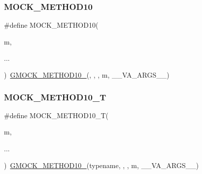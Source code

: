 \mbox{\label{_obj__test_2lib_2googletest-master_2googlemock_2include_2gmock_2gmock-generated-function-mockers_8h_a01760fdd295f5a92264eed6a9ff1dbf8}} 
\subsubsection{\texorpdfstring{MOCK\_METHOD10}{MOCK\_METHOD10}}
{\footnotesize\ttfamily \#define M\+O\+C\+K\+\_\+\+M\+E\+T\+H\+O\+D10(\begin{DoxyParamCaption}\item[{}]{m,  }\item[{}]{... }\end{DoxyParamCaption})~\mbox{\hyperlink{_obj__test_2lib_2googletest-release-1_88_81_2googlemock_2include_2gmock_2gmock-generated-function-mockers_8h_a81a48223a8771de36ef92ac6d56f6e81}{G\+M\+O\+C\+K\+\_\+\+M\+E\+T\+H\+O\+D10\+\_\+}}(, , , m, \+\_\+\+\_\+\+V\+A\+\_\+\+A\+R\+G\+S\+\_\+\+\_\+)}

\mbox{\label{_obj__test_2lib_2googletest-master_2googlemock_2include_2gmock_2gmock-generated-function-mockers_8h_aa28723ba52933b5ea9a4ffa1a73d15e1}} 
\subsubsection{\texorpdfstring{MOCK\_METHOD10\_T}{MOCK\_METHOD10\_T}}
{\footnotesize\ttfamily \#define M\+O\+C\+K\+\_\+\+M\+E\+T\+H\+O\+D10\+\_\+T(\begin{DoxyParamCaption}\item[{}]{m,  }\item[{}]{... }\end{DoxyParamCaption})~\mbox{\hyperlink{_obj__test_2lib_2googletest-release-1_88_81_2googlemock_2include_2gmock_2gmock-generated-function-mockers_8h_a81a48223a8771de36ef92ac6d56f6e81}{G\+M\+O\+C\+K\+\_\+\+M\+E\+T\+H\+O\+D10\+\_\+}}(typename, , , m, \+\_\+\+\_\+\+V\+A\+\_\+\+A\+R\+G\+S\+\_\+\+\_\+)}

